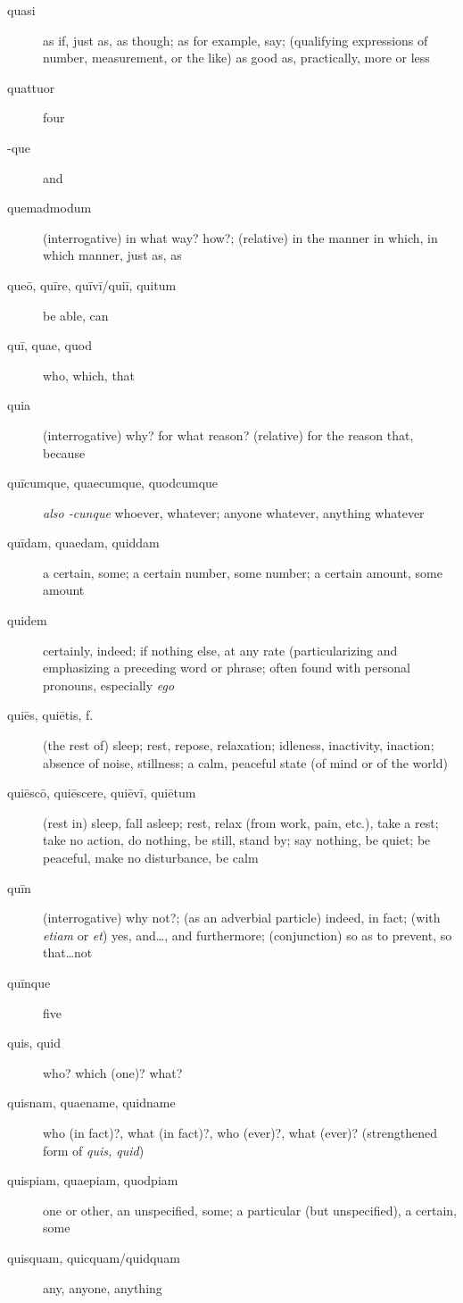 \begin{description}
    \item[quasi] as if, just as, as though; as for example, say; (qualifying expressions of number, measurement, or the like) as good as, practically, more or less
    \item[quattuor] four
    \item[-que] and
    \item[quemadmodum] (interrogative) in what way? how?; (relative) in the manner in which, in which manner, just as, as
    \item[queō, quīre, quīvī/quiī, quitum] be able, can
    \item[quī, quae, quod] who, which, that
    \item[quia] (interrogative) why? for what reason? (relative) for the reason that, because
    \item[quīcumque, quaecumque, quodcumque] \textit{also -cunque} whoever, whatever; anyone whatever, anything whatever
    \item[quīdam, quaedam, quiddam] a certain, some; a certain number, some number; a certain amount, some amount
    \item[quidem] certainly, indeed; if nothing else, at any rate (particularizing and emphasizing a preceding word or phrase; often found with personal pronouns, especially \textit{ego}
    \item[quiēs, quiētis, f.] (the rest of) sleep; rest, repose, relaxation; idleness, inactivity, inaction; absence of noise, stillness; a calm, peaceful state (of mind or of the world)
    \item[quiēscō, quiēscere, quiēvī, quiētum] (rest in) sleep, fall asleep; rest, relax (from work, pain, etc.), take a rest; take no action, do nothing, be still, stand by; say nothing, be quiet; be peaceful, make no disturbance, be calm
    \item[quīn] (interrogative) why not?; (as an adverbial particle) indeed, in fact; (with \textit{etiam} or \textit{et}) yes, and\dots, and furthermore; (conjunction) so as to prevent, so that\dots not
    \item[quīnque] five
    \item[quis, quid] who? which (one)? what?
    \item[quisnam, quaename, quidname] who (in fact)?, what (in fact)?, who (ever)?, what (ever)? (strengthened form of \textit{quis, quid})
    \item[quispiam, quaepiam, quodpiam] one or other, an unspecified, some; a particular (but unspecified), a certain, some
    \item[quisquam, quicquam/quidquam] any, anyone, anything

\end{description}
